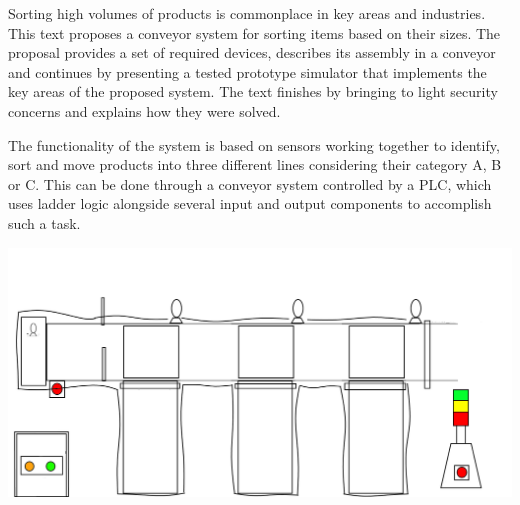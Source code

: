 Sorting high volumes of products is commonplace in key areas and industries. This text proposes a conveyor system for sorting items based on their sizes. The proposal provides a set of required devices, describes its assembly in a conveyor and continues by presenting a tested prototype simulator that implements the key areas of the proposed system. The text finishes by bringing to light security concerns and explains how they were solved.

The functionality of the system is based on sensors working together to identify, sort and move products into three different lines considering their category A, B or C. This can be done through a conveyor system controlled by a PLC, which uses ladder logic alongside several input and output components to accomplish such a task.

\includegraphics[scale=0.5]{../external/system_graphics_basic.png}
